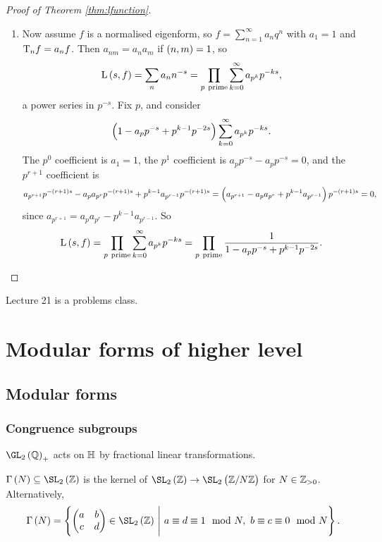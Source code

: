 \begin{proof}[Proof of Theorem \ref{thm:lfunction}]
\begin{enumerate}
\item Now assume $ f $ is a normalised eigenform, so $ f = \sum_{n = 1}^\infty a_nq^n $ with $ a_1 = 1 $ and $ \mathrm{T}_nf = a_nf $. Then $ a_{nm} = a_na_m $ if $ \br{n, m} = 1 $, so
$$ \L\br{s, f} = \sum_n a_nn^{-s} = \prod_{p \ \text{prime}} \sum_{k = 0}^\infty a_{p^k}p^{-ks}, $$
a power series in $ p^{-s} $. Fix $ p $, and consider
$$ \br{1 - a_pp^{-s} + p^{k - 1}p^{-2s}}\sum_{k = 0}^\infty a_{p^k}p^{-ks}. $$
The $ p^0 $ coefficient is $ a_1 = 1 $, the $ p^1 $ coefficient is $ a_pp^{-s} - a_pp^{-s} = 0 $, and the $ p^{r + 1} $ coefficient is
$$ a_{p^{r + 1}}p^{-\br{r + 1}s} - a_pa_{p^r}p^{-\br{r + 1}s} + p^{k - 1}a_{p^{r - 1}}p^{-\br{r + 1}s} = \br{a_{p^{r + 1}} - a_pa_{p^r} + p^{k - 1}a_{p^{r - 1}}}p^{-\br{r + 1}s} = 0, $$
since $ a_{p^{r + 1}} = a_pa_{p^r} - p^{k - 1}a_{p^{r - 1}} $. So
$$ \L\br{s, f} = \prod_{p \ \text{prime}} \sum_{k = 0}^\infty a_{p^k}p^{-ks} = \prod_{p \ \text{prime}} \dfrac{1}{1 - a_pp^{-s} + p^{k - 1}p^{-2s}}. $$
\end{enumerate}
\end{proof}


Lecture 21 is a problems class.

\pagebreak

\section{Modular forms of higher level}

\subsection{Modular forms}

\subsubsection{Congruence subgroups}


$ \GL_2\br{\QQ}_+ $ acts on $ \mathbb{H} $ by fractional linear transformations.

\begin{definition}
$ \Gamma\br{N} \subseteq \SL_2\br{\ZZ} $ is the kernel of $ \SL_2\br{\ZZ} \to \SL_2\br{\ZZ / N\ZZ} $ for $ N \in \mathbb{Z}_{> 0} $. Alternatively,
$$ \Gamma\br{N} = \cbr{\twobytwo{a}{b}{c}{d} \in \SL_2\br{\ZZ} \st a \equiv d \equiv 1 \mod N, \ b \equiv c \equiv 0 \mod N}. $$
\end{definition}

